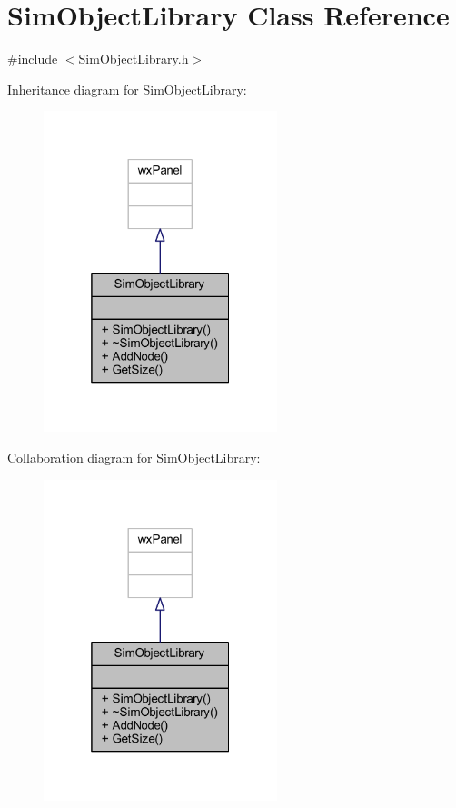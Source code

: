 \hypertarget{class_sim_object_library}{}\section{Sim\+Object\+Library Class Reference}
\label{class_sim_object_library}


{\ttfamily \#include $<$Sim\+Object\+Library.\+h$>$}



Inheritance diagram for Sim\+Object\+Library\+:
\nopagebreak
\begin{figure}[H]
\begin{center}
\leavevmode
\includegraphics[width=193pt]{class_sim_object_library__inherit__graph}
\end{center}
\end{figure}


Collaboration diagram for Sim\+Object\+Library\+:
\nopagebreak
\begin{figure}[H]
\begin{center}
\leavevmode
\includegraphics[width=193pt]{class_sim_object_library__coll__graph}
\end{center}
\end{figure}
